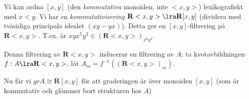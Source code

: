 Vi kan ordna $[x, y]$ (den \textit{kommutativa} monoiden, inte $<x,y>$) 
lexikografiskt med $x<y$. Vi har en \textit{kommutativisering}
$\mathbf{R}<x,y> \lra \mathbf{R}[x,y]$ (dividera med tvåsidiga
principala idealet $(xy-yx)$). Detta ger en $[x,y]$-filtrering
på $\mathbf{R}<x,y>$. T.ex. är 
$xyx^5y^2\in (\mathbf{R}<x,y>)_{x^6y^3}$. 

Denna filtrering av $\mathbf{R}<x,y>$ inducerar en filtrering av $A$:
ta kvotavbildningen $f: A\lra \mathbf{R}<x,y>$.
låt $A_m = f^{-1}((\mathbf{R}<x,y>)_m)$.

Nu får vi $gr A \cong \mathbf{R}[x,y]$
för att graderingen är över monoiden $[x, y]$ (som är kommutativ
och glömmer bort strukturen hos $A$)

